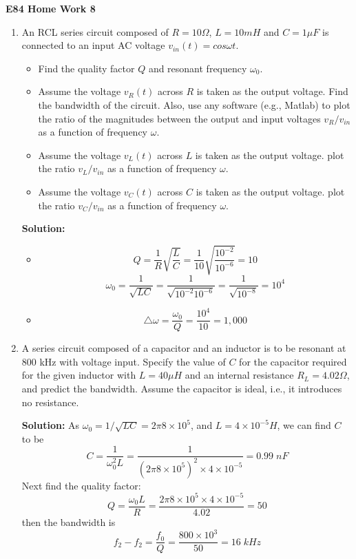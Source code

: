\usepackage{html}

\begin{center}
{\Large \bf E84 Home Work 8}
\end{center}
\begin{enumerate}

\item An RCL series circuit composed of $R=10\Omega$, $L=10 mH$ and
$C=1 \mu F$ is connected to an input AC voltage $v_{in}(t)=cos\omega t$.
\begin{itemize}
\item Find the quality factor $Q$ and resonant frequency $\omega_0$.
\item Assume the voltage $v_R(t)$ across $R$ is taken as the output voltage.
  Find the bandwidth of the circuit. Also, use any software (e.g., Matlab) 
  to plot the ratio of the magnitudes between the output and input voltages 
  $v_R/v_{in}$ as a function of frequency $\omega$.
\item Assume the voltage $v_L(t)$ across $L$ is taken as the output voltage.
  plot the ratio $v_L/v_{in}$ as a function of frequency $\omega$.
\item Assume the voltage $v_C(t)$ across $C$ is taken as the output voltage.
  plot the ratio $v_C/v_{in}$ as a function of frequency $\omega$.
\end{itemize}

  {\bf Solution:}
 \begin{itemize}
  \item 
  \[ Q=\frac{1}{R}\sqrt{\frac{L}{C}}=\frac{1}{10}\sqrt{\frac{10^{-2}}{10^{-6}}}
     =10 \]
  \[ \omega_0=\frac{1}{\sqrt{LC}}=\frac{1}{\sqrt{10^{-2}10^{-6}}}
     =\frac{1}{\sqrt{10^{-8}}}=10^4 \]
  \item 
  \[ \triangle \omega=\frac{\omega_0}{Q}=\frac{10^4}{10}=1,000 \]
  \end{itemize}

\item A series circuit composed of a capacitor and an inductor is to be 
resonant at 800 kHz with voltage input. Specify the value of $C$ for the 
capacitor required for the given inductor with $L=40\mu H$ and an internal 
resistance $R_L=4.02\Omega$, and predict the bandwidth. Assume the capacitor 
is ideal, i.e., it introduces no resistance.

  {\bf Solution:}
   As $\omega_0=1/\sqrt{LC}=2\pi 8\times 10^5$, and $L=4\times 10^{-5}H$, we
   can find $C$ to be
   \[
   C=\frac{1}{\omega_0^2 L}=\frac{1}{(2\pi 8\times 10^5)^2\times 4\times 10^{-5}}
   =0.99\;nF	\]
   Next find the quality factor:
   \[
   Q=\frac{\omega_0L}{R}=\frac{2\pi 8\times 10^5\times 4\times 10^{-5}}{4.02}=50
   \]
   then the bandwidth is
   \[	f_2-f_2=\frac{f_0}{Q}=\frac{800\times 10^3}{50}=16\;kHz	\]


\end{enumerate}
